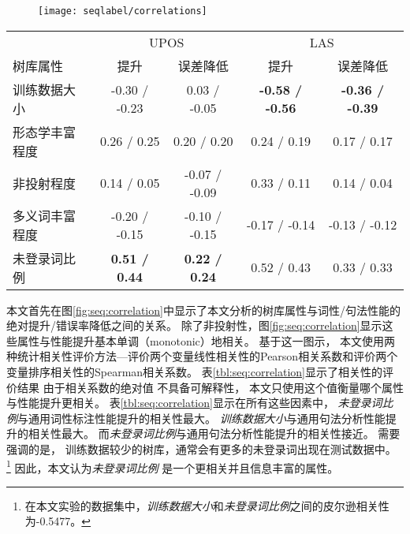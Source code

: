 \begin{figure}[t]
	\texttt{[image: seqlabel/correlations]}
\end{figure}
\begin{table}[t]
	\vspace{0.5em}\centering\wuhao
	\begin{tabular}{lcccc}
		\toprule[1.5pt]
		& \multicolumn{2}{c}{UPOS} & \multicolumn{2}{c}{LAS} \\
		树库属性 & 提升 & 误差降低 & 提升 & 误差降低 \\
		\midrule[1pt]
		训练数据大小 & -0.30 / -0.23 & 0.03 / -0.05 & \bf -0.58 / -0.56 & \bf -0.36 / -0.39 \\
形态学丰富程度 & 0.26 / 0.25 & 0.20 / 0.20 & 0.24 / 0.19 & 0.17 / 0.17 \\
非投射程度 & 0.14 / 0.05 & -0.07 / -0.09 & 0.33 / 0.11 & 0.14 / 0.04 \\
多义词丰富程度 & -0.20 / -0.15 & -0.10 / -0.15 & -0.17 / -0.14 & -0.13 / -0.12 \\
未登录词比例 &\bf  0.51 / 0.44 & \bf 0.22 / 0.24 & 0.52 / 0.43 & 0.33 / 0.33 \\
		\bottomrule[1.5pt]
	\end{tabular}
\end{table}

本文首先在图\ref{fig:seq:correlation}中显示了本文分析的树库属性与词性/句法性能的绝对提升/错误率降低之间的关系。
除了非投射性，图\ref{fig:seq:correlation}显示这些属性与性能提升基本单调（monotonic）地相关。
基于这一图示，
本文使用两种统计相关性评价方法---评价两个变量线性相关性的Pearson相关系数和评价两个变量排序相关性的Spearman相关系数。
表\ref{tbl:seq:correlation}显示了相关性的评价结果
由于相关系数的绝对值
不具备可解释性，
本文只使用这个值衡量哪个属性
与性能提升更相关。
表\ref{tbl:seq:correlation}显示在所有这些因素中，
\textit{未登录词比例}与通用词性标注性能提升的相关性最大。
\textit{训练数据大小}与通用句法分析性能提升的相关性最大。
而\textit{未登录词比例}与通用句法分析性能提升的相关性接近。
需要强调的是，
训练数据较少的树库，通常会有更多的未登录词出现在测试数据中。
\footnote{在本文实验的数据集中，\textit{训练数据大小}和\textit{未登录词比例}之间的皮尔逊相关性为-0.5477。}
因此，本文认为\textit{未登录词比例} 是一个更相关并且信息丰富的属性。

